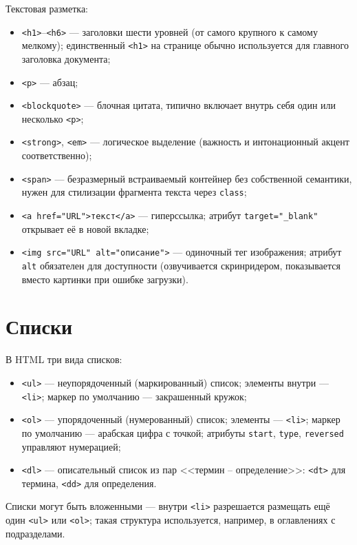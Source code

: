 Текстовая разметка:
\begin{itemize}
  \item \texttt{<h1>}--\texttt{<h6>} --- заголовки шести уровней
        (от самого крупного к самому мелкому); единственный
        \texttt{<h1>} на странице обычно используется для главного
        заголовка документа;
  \item \texttt{<p>} --- абзац;
  \item \texttt{<blockquote>} --- блочная цитата, типично включает
        внутрь себя один или несколько \texttt{<p>};
  \item \texttt{<strong>}, \texttt{<em>} --- логическое выделение
        (важность и интонационный акцент соответственно);
  \item \texttt{<span>} --- безразмерный встраиваемый контейнер
        без собственной семантики, нужен для стилизации
        фрагмента текста через \texttt{class};
  \item \texttt{<a~href="URL">текст</a>} --- гиперссылка;
        атрибут \texttt{target="\_blank"} открывает её в новой
        вкладке;
  \item \texttt{<img~src="URL"~alt="описание">} --- одиночный тег
        изображения; атрибут \texttt{alt} обязателен для
        доступности (озвучивается скринридером, показывается
        вместо картинки при ошибке загрузки).
\end{itemize}

\section{Списки}

В HTML три вида списков:
\begin{itemize}
  \item \texttt{<ul>} --- неупорядоченный (маркированный) список;
        элементы внутри --- \texttt{<li>}; маркер по умолчанию ---
        закрашенный кружок;
  \item \texttt{<ol>} --- упорядоченный (нумерованный) список;
        элементы --- \texttt{<li>}; маркер по умолчанию ---
        арабская цифра с точкой; атрибуты \texttt{start},
        \texttt{type}, \texttt{reversed} управляют нумерацией;
  \item \texttt{<dl>} --- описательный список из пар
        <<термин -- определение>>: \texttt{<dt>} для термина,
        \texttt{<dd>} для определения.
\end{itemize}

Списки могут быть вложенными --- внутри \texttt{<li>} разрешается
размещать ещё один \texttt{<ul>} или \texttt{<ol>}; такая структура
используется, например, в оглавлениях с подразделами.

